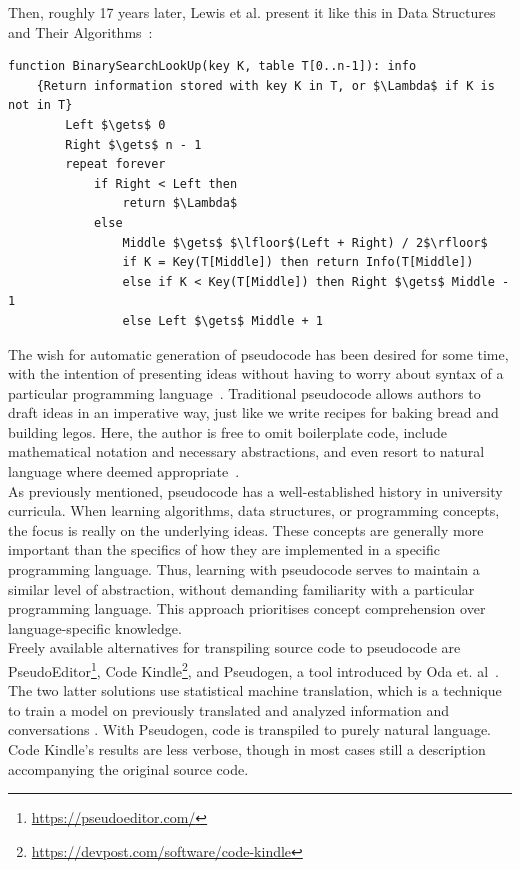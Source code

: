 Then, roughly 17 years later, Lewis et al. present it like this in Data Structures and Their Algorithms~\cite[182]{BOOK:DSA/Lewis}: \hfill \\

\begin{lstlisting}[basicstyle=\footnotesize\ttfamily]
    function BinarySearchLookUp(key K, table T[0..n-1]): info
    {Return information stored with key K in T, or $\Lambda$ if K is not in T}
        Left $\gets$ 0
        Right $\gets$ n - 1
        repeat forever
            if Right < Left then
                return $\Lambda$
            else
                Middle $\gets$ $\lfloor$(Left + Right) / 2$\rfloor$
                if K = Key(T[Middle]) then return Info(T[Middle])
                else if K < Key(T[Middle]) then Right $\gets$ Middle - 1
                else Left $\gets$ Middle + 1
\end{lstlisting}

The wish for automatic generation of pseudocode has been desired for some time, with the intention of presenting ideas without having to worry about syntax of a particular programming language~\cite{desireToGetPseudocodeGeneration}. Traditional pseudocode allows authors to draft ideas in an imperative way, just like we write recipes for baking bread and building legos. Here, the author is free to omit boilerplate code, include mathematical notation and necessary abstractions, and even resort to natural language where deemed appropriate~\cite{BOOK:intro/Cormen/Leiserson, DBLP:conf/els/Nuallain15}. \hfill \\

As previously mentioned, pseudocode has a well-established history in university curricula. When learning algorithms, data structures, or programming concepts, the focus is really on the underlying ideas. These concepts are generally more important than the specifics of how they are implemented in a specific programming language. Thus, learning with pseudocode serves to maintain a similar level of abstraction, without demanding familiarity with a particular programming language. This approach prioritises concept comprehension over language-specific knowledge. \hfill \\

Freely available alternatives for transpiling source code to pseudocode are PseudoEditor\footnote{\url{https://pseudoeditor.com/}}, Code Kindle\footnote{\url{https://devpost.com/software/code-kindle}}, and Pseudogen, a tool introduced by Oda et. al~\cite{DBLP:conf/kbse/OdaFNHSTN15}. The two latter solutions use statistical machine translation, which is a technique to train a model on previously translated and analyzed information and conversations%
. With Pseudogen, code is transpiled to purely natural language. Code Kindle's results are less verbose, though in most cases still a description accompanying the original source code. \hfill \\


